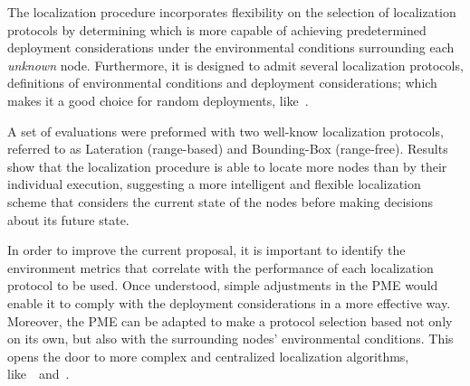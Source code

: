 The localization procedure incorporates flexibility on the selection of localization protocols by determining which is more capable of achieving predetermined deployment considerations under the environmental conditions surrounding each \emph{unknown} node. Furthermore, it is designed to admit several localization protocols, definitions of environmental conditions and deployment considerations; which makes it a good choice for random deployments, like~\cite{airDroppedVolvano}.

A set of evaluations were preformed with two well-know localization protocols, referred to as Lateration (range-based) and Bounding-Box (range-free). Results show that the localization procedure is able to locate more nodes than by their individual execution, suggesting a more intelligent and flexible localization scheme that considers the current state of the nodes before making decisions about its future state.


In order to improve the current proposal, it is important to identify the environment metrics that correlate with the performance of each localization protocol to be used. Once understood, simple adjustments in the PME would enable it to comply with the deployment considerations in a more effective way. Moreover, the PME can be adapted to make a protocol selection based not only on its own, but also with the surrounding nodes' environmental conditions. This opens the door to more complex and centralized localization algorithms, like~\cite{pal2010localization}~and~\cite{alippi2006rssi}.
